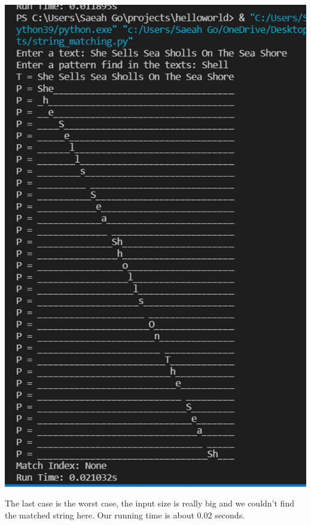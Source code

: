 \documentclass{article}
\begin{document}
\begin{center}
\includegraphics[scale = 0.68]{inputsize 37 worst.png} \\
\end{center}
The last case is the worst case, the input size is really big and we couldn't find the matched string here. Our running time is about $0.02$ seconds.
\end{document}
